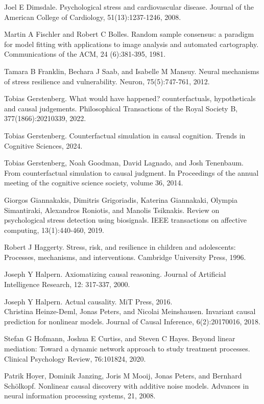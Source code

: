 \documentclass[10pt]{article}
\begin{document}
Joel E Dimsdale. Psychological stress and cardiovascular disease. Journal of the American College of Cardiology, 51(13):1237-1246, 2008.

Martin A Fischler and Robert C Bolles. Random sample consensus: a paradigm for model fitting with applications to image analysis and automated cartography. Communications of the ACM, 24 (6):381-395, 1981.

Tamara B Franklin, Bechara J Saab, and Isabelle M Mansuy. Neural mechanisms of stress resilience and vulnerability. Neuron, 75(5):747-761, 2012.

Tobias Gerstenberg. What would have happened? counterfactuals, hypotheticals and causal judgements. Philosophical Transactions of the Royal Society B, 377(1866):20210339, 2022.

Tobias Gerstenberg. Counterfactual simulation in causal cognition. Trends in Cognitive Sciences, 2024.

Tobias Gerstenberg, Noah Goodman, David Lagnado, and Josh Tenenbaum. From counterfactual simulation to causal judgment. In Proceedings of the annual meeting of the cognitive science society, volume 36, 2014.

Giorgos Giannakakis, Dimitris Grigoriadis, Katerina Giannakaki, Olympia Simantiraki, Alexandros Roniotis, and Manolis Tsiknakis. Review on psychological stress detection using biosignals. IEEE transactions on affective computing, 13(1):440-460, 2019.

Robert J Haggerty. Stress, risk, and resilience in children and adolescents: Processes, mechanisms, and interventions. Cambridge University Press, 1996.

Joseph Y Halpern. Axiomatizing causal reasoning. Journal of Artificial Intelligence Research, 12: 317-337, 2000.

Joseph Y Halpern. Actual causality. MiT Press, 2016.\\
Christina Heinze-Deml, Jonas Peters, and Nicolai Meinshausen. Invariant causal prediction for nonlinear models. Journal of Causal Inference, 6(2):20170016, 2018.

Stefan G Hofmann, Joshua E Curtiss, and Steven C Hayes. Beyond linear mediation: Toward a dynamic network approach to study treatment processes. Clinical Psychology Review, 76:101824, 2020.

Patrik Hoyer, Dominik Janzing, Joris M Mooij, Jonas Peters, and Bernhard Schölkopf. Nonlinear causal discovery with additive noise models. Advances in neural information processing systems, 21, 2008.
\end{document}
